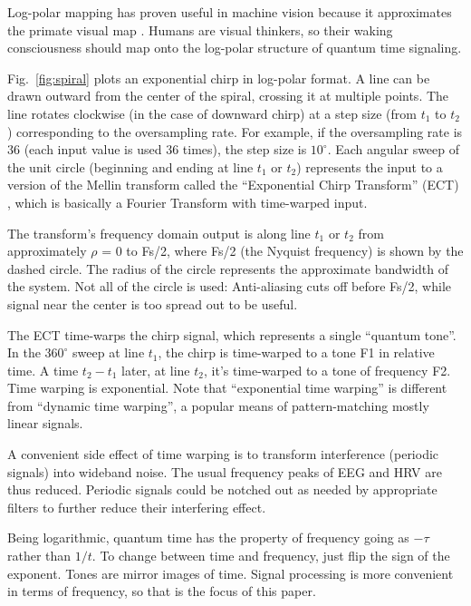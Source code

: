Log-polar mapping has proven useful in machine vision \cite{Bonmassar}
because it approximates the primate visual map \cite{Schwartz}.
Humans are visual thinkers, so their waking consciousness should map onto the
log-polar structure of quantum time signaling.

Fig.~\ref{fig:spiral} plots an exponential chirp in log-polar format.
A line can be drawn outward from the center of the spiral, crossing it at
multiple points.
The line rotates clockwise (in the case of downward chirp) at a step size
(from $t_1$ to $t_2$) corresponding to the oversampling rate.
For example, if the oversampling rate is 36 (each input value is used 36 times),
the step size is $10^{\circ}$.
Each angular sweep of the unit circle
(beginning and ending at line $t_1$ or $t_2$)
represents the input to a version of the Mellin transform called the
``Exponential Chirp Transform'' (ECT) \cite{Bonmassar}, which is
basically a Fourier Transform with time-warped input.

The transform's frequency domain output is along line $t_1$ or $t_2$ from
approximately $\rho$ = 0 to Fs/2, where Fs/2 (the Nyquist frequency)
is shown by the dashed circle.
The radius of the circle represents the approximate bandwidth of the system.
Not all of the circle is used: Anti-aliasing cuts off before Fs/2, while signal
near the center is too spread out to be useful.

The ECT time-warps the chirp signal, which represents a single ``quantum tone''.
In the $360^{\circ}$ sweep at line $t_1$,
the chirp is time-warped to a tone F1 in relative time.
A time $t_2-t_1$ later, at line $t_2$,
it's time-warped to a tone of frequency F2.
Time warping is exponential.
Note that ``exponential time warping'' is different from ``dynamic time
warping'', a popular means of pattern-matching mostly linear signals.

A convenient side effect of time warping is to transform interference
(periodic signals) into wideband noise.
The usual frequency peaks of EEG and HRV are thus reduced.
Periodic signals could be notched out as needed by appropriate filters
to further reduce their interfering effect.

Being logarithmic, quantum time has the property of frequency going as
$-\tau$ rather than $1/t$.
To change between time and frequency, just flip the sign of the exponent.
Tones are mirror images of time.
Signal processing is more convenient in terms of frequency,
so that is the focus of this paper.

